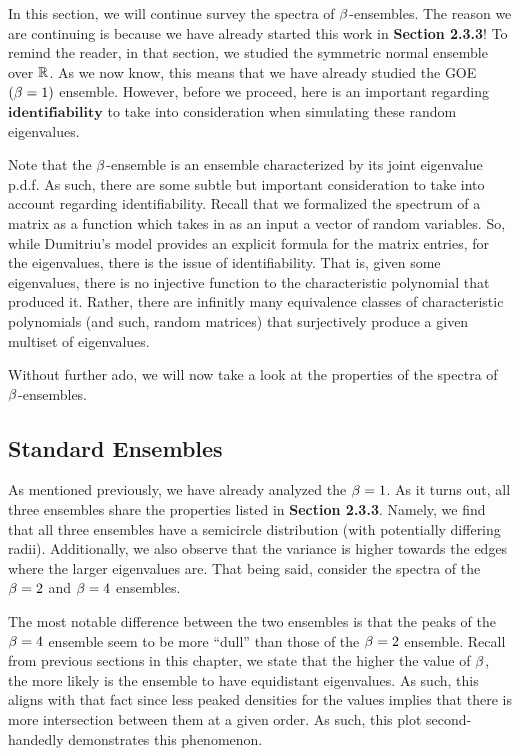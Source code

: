 In this section, we will continue survey the spectra of $\beta$-ensembles. The reason we are continuing is because we have already started this work in \textbf{Section 2.3.3}!
To remind the reader, in that section, we studied the symmetric normal ensemble over $\mathbb{R}$. As we now know, this means that we have already studied the GOE $(\beta = 1)$ ensemble.
However, before we proceed, here is an important regarding $\textbf{identifiability}$ to take into consideration when simulating these random eigenvalues.

\begin{remark}
Note that the  $\beta$-ensemble is an ensemble characterized by its joint eigenvalue p.d.f.
As such, there are some subtle but important consideration to take into account regarding identifiability.
Recall that we formalized the spectrum of a matrix as a function which takes in as an input a vector of random variables.
So, while Dumitriu's model provides an explicit formula for the matrix entries, for the eigenvalues, there is the issue of identifiability.
That is, given some eigenvalues, there is no injective function to the characteristic polynomial that produced it.
Rather, there are infinitly many equivalence classes of characteristic polynomials (and such, random matrices) that surjectively produce a given multiset of eigenvalues.
\end{remark}

Without further ado, we will now take a look at the properties of the spectra of $\beta$-ensembles.


\subsection{Standard Ensembles}

As mentioned previously, we have already analyzed the $\beta = 1$. As it turns out, all three ensembles share the properties listed in \textbf{Section 2.3.3}. Namely, we find that all three ensembles have a semicircle distribution (with potentially differing radii). Additionally, we also observe that the variance is higher towards the edges where the larger eigenvalues are. That being said, consider the spectra of the $\beta = 2$ and $\beta = 4$ ensembles.
\trim
{}

\newpage

The most notable difference between the two ensembles is that the peaks of the $\beta = 4$ ensemble seem to be more ``dull'' than those of the $\beta = 2$ ensemble. Recall from previous sections in this chapter, we state that the higher the value of $\beta$, the more likely is the ensemble to have equidistant eigenvalues. As such, this aligns with that fact since less peaked densities for the values implies that there is more intersection between them at a given order. As such, this plot second-handedly demonstrates this phenomenon.


